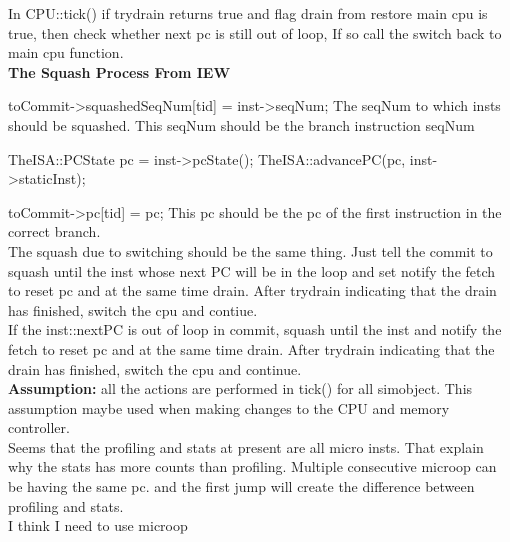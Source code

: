 \documentclass[11pt]{article}
\begin{document}
In CPU::tick() if trydrain returns true and flag drain from restore main cpu is true, then check whether next pc is still out of loop, If so call the switch back to main cpu function.\\

\textbf{The Squash Process From IEW\\}

toCommit-\textgreater squashedSeqNum[tid] = inst-\textgreater seqNum; The seqNum to which insts should be squashed. This seqNum should be the branch instruction seqNum

TheISA::PCState pc = inst-\textgreater pcState();
TheISA::advancePC(pc, inst-\textgreater staticInst);

toCommit-\textgreater pc[tid] = pc; This pc should be the pc of the first instruction in the correct branch.\\

The squash due to switching should be the same thing. Just tell the commit to squash until the inst whose next PC will be in the loop and set notify the fetch to reset pc and at the same time drain. After trydrain indicating that the drain has finished, switch the cpu and contiue. \\

If the inst::nextPC is out of loop in commit, squash until the inst and notify the fetch to reset pc and at the same time drain. After trydrain indicating that the drain has finished, switch the cpu and continue.\\

\textbf{Assumption:} all the actions are performed in tick() for all simobject. This assumption maybe used when making changes to the CPU and memory controller.\\

Seems that the profiling and stats at present are all micro insts. That explain why the stats has more counts than profiling. Multiple consecutive microop can be having the same pc. and the first jump will create the difference between profiling and stats.\\

I think I need to use microop
\end{document}

